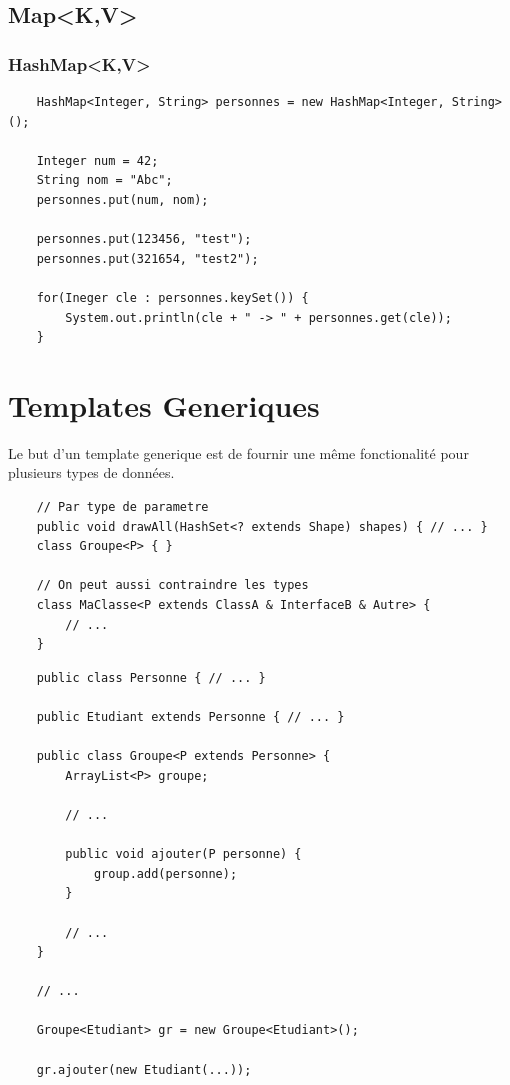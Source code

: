 \documentclass[a4paper, 12pt, french]{article}
\begin{document}
	\subsection{Map<K,V>}

	\subsubsection{HashMap<K,V>}

	\begin{lstlisting}
	HashMap<Integer, String> personnes = new HashMap<Integer, String>();

	Integer num = 42;
	String nom = "Abc";
	personnes.put(num, nom);

	personnes.put(123456, "test");
	personnes.put(321654, "test2");

	for(Ineger cle : personnes.keySet()) {
		System.out.println(cle + " -> " + personnes.get(cle));
	}
	\end{lstlisting}

	\section{Templates Generiques}

	Le but d'un template generique est de fournir une même fonctionalité pour plusieurs types de données.

	\begin{lstlisting}
	// Par type de parametre
	public void drawAll(HashSet<? extends Shape) shapes) { // ... }
	class Groupe<P> { }

	// On peut aussi contraindre les types
	class MaClasse<P extends ClassA & InterfaceB & Autre> {
		// ...
	}
	\end{lstlisting}

	\begin{lstlisting}
	public class Personne { // ... }

	public Etudiant extends Personne { // ... }

	public class Groupe<P extends Personne> {
		ArrayList<P> groupe;

		// ...

		public void ajouter(P personne) {
			group.add(personne);
		}

		// ...
	}

	// ...

	Groupe<Etudiant> gr = new Groupe<Etudiant>();

	gr.ajouter(new Etudiant(...));
	\end{lstlisting}
\end{document}

